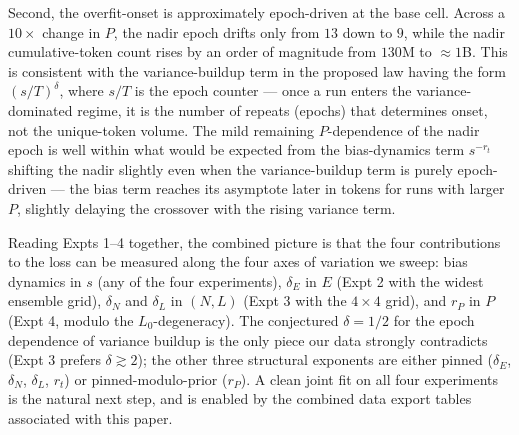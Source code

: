 Second, the overfit-onset is approximately epoch-driven at the base cell.
Across a $10\times$ change in $P$, the nadir epoch drifts only from $13$ down to $9$, while the nadir cumulative-token count rises by an order of magnitude from $130$M to $\approx 1$B.
This is consistent with the variance-buildup term in the proposed law having the form $(s/T)^\delta$, where $s/T$ is the epoch counter --- once a run enters the variance-dominated regime, it is the number of repeats (epochs) that determines onset, not the unique-token volume.
The mild remaining $P$-dependence of the nadir epoch is well within what would be expected from the bias-dynamics term $s^{-r_t}$ shifting the nadir slightly even when the variance-buildup term is purely epoch-driven --- the bias term reaches its asymptote later in tokens for runs with larger $P$, slightly delaying the crossover with the rising variance term.

Reading Expts 1--4 together, the combined picture is that the four contributions to the loss can be measured along the four axes of variation we sweep: bias dynamics in $s$ (any of the four experiments), $\delta_E$ in $E$ (Expt 2 with the widest ensemble grid), $\delta_N$ and $\delta_L$ in $(N, L)$ (Expt 3 with the $4 \times 4$ grid), and $r_P$ in $P$ (Expt 4, modulo the $L_0$-degeneracy).
The conjectured $\delta = 1/2$ for the epoch dependence of variance buildup is the only piece our data strongly contradicts (Expt 3 prefers $\delta \gtrsim 2$); the other three structural exponents are either pinned ($\delta_E$, $\delta_N$, $\delta_L$, $r_t$) or pinned-modulo-prior ($r_P$).
A clean joint fit on all four experiments is the natural next step, and is enabled by the combined data export tables associated with this paper.
